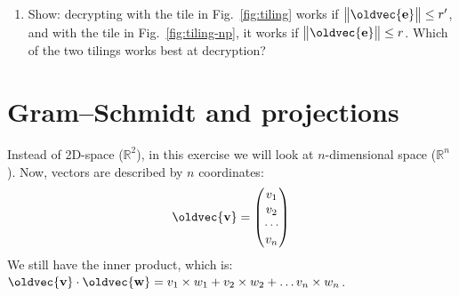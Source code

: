 \documentclass[10pt,a4paper]{article}
\renewcommand{\vec}[1]{\oldvec{\mathbf{#1}}}
\newcommand{\RR}{\mathbb{R}}
\DeclarePairedDelimiter{\norm}{\big\lVert}{\big\rVert}
\begin{document}
\begin{enumerate}[resume*]
	\item Show: decrypting with the tile in Fig.~\ref{fig:tiling}
	works if \(\norm{\vec{e}} \leq r'\),
	and with the tile in Fig.~\ref{fig:tiling-np}, it works if \(\norm{\vec{e}} \leq r\).
	Which of the two tilings works best at decryption?
\end{enumerate}

\clearpage
\section{Gram--Schmidt and projections}

Instead of 2D-space (\(\RR^2\)), in this exercise we will look at \(n\)-dimensional space (\(\RR^n\)).
Now, vectors are described by \(n\) coordinates:
\[
	\vec{v} = \begin{pmatrix} v_1 \\ v_2 \\ \cdots \\ v_n \end{pmatrix}
\]
We still have the inner product, which is:
\(\vec{v} \cdot \vec{w} = v_1 \times w_1 + v_2 \times w_2 + \ldots v_n \times w_n\).
\end{document}
